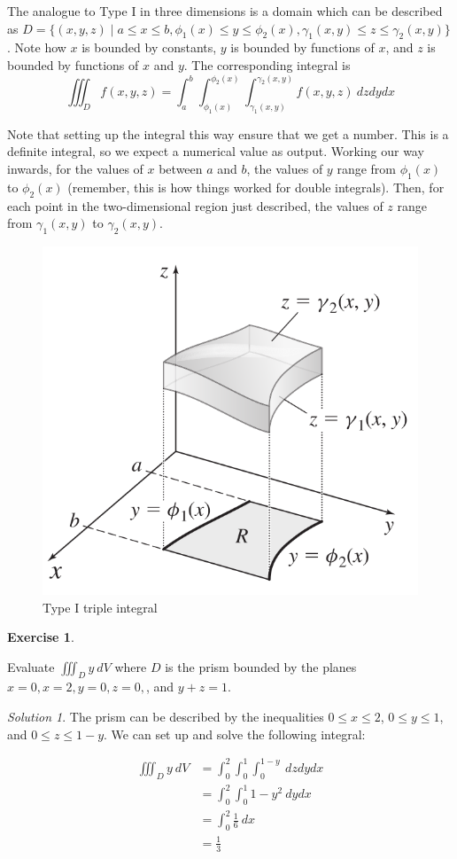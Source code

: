 \documentclass[
]{book}
\theoremstyle{definition}
\theoremstyle{definition}
\theoremstyle{definition}
\newtheorem{exercise}{Exercise}[chapter]
\theoremstyle{definition}
\theoremstyle{remark}
\newtheorem*{solution}{Solution}
\begin{document}
The analogue to Type I in three dimensions is a domain which can be described as \(D=\{(x,y,z)\mid a\leq x\leq b, \phi_1(x)\leq y\leq \phi_2(x), \gamma_1(x,y) \leq z \leq \gamma_2(x,y)\}\). Note how \(x\) is bounded by constants, \(y\) is bounded by functions of \(x\), and \(z\) is bounded by functions of \(x\) and \(y\). The corresponding integral is \[\iiint_D f(x,y,z) = \int_a^b \int_{\phi_1(x)}^{\phi_2(x)}\int_{\gamma_1(x,y)}^{\gamma_2(x,y)}f(x,y,z)~dzdydx\]

Note that setting up the integral this way ensure that we get a number. This is a definite integral, so we expect a numerical value as output. Working our way inwards, for the values of \(x\) between \(a\) and \(b\), the values of \(y\) range from \(\phi_1(x)\) to \(\phi_2(x)\) (remember, this is how things worked for double integrals). Then, for each point in the two-dimensional region just described, the values of \(z\) range from \(\gamma_1(x,y)\) to \(\gamma_2(x,y)\).

\begin{figure}

{\centering \includegraphics[width=0.5\linewidth]{images/lec-15-triple} 

}

\caption{Type I triple integral}\label{fig:unnamed-chunk-29}
\end{figure}

\begin{exercise}
\protect\hypertarget{exr:unlabeled-div-118}{}\label{exr:unlabeled-div-118}

Evaluate \(\displaystyle \iiint_D y~dV\) where \(D\) is the prism bounded by the planes \(x=0, x=2, y=0, z=0,\), and \(y+z=1\).

\end{exercise}

\begin{solution}

The prism can be described by the inequalities \(0\leq x\leq 2\), \(0\leq y \leq 1\), and \(0\leq z\leq 1-y\). We can set up and solve the following integral:

\begin{align*}
\iiint_D y~dV &= \int_0^2\int_0^1\int_0^{1-y}~dzdydx \\
&= \int_0^2 \int_0^1 1-y^2~dydx\\
&= \int_0^2 \frac{1}{6}~dx\\
&= \frac{1}{3}
\end{align*}

\end{solution}
\end{document}
